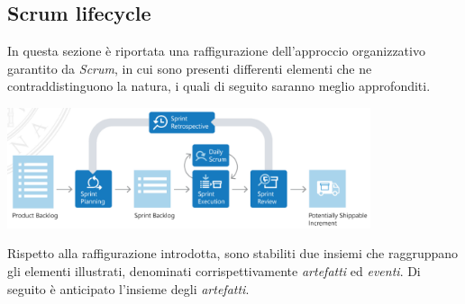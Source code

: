 \documentclass{article}
\begin{document}
\subsection*{Scrum lifecycle}
\large
In questa sezione è riportata una raffigurazione dell'approccio organizzativo garantito da \textit{Scrum}, in cui sono presenti differenti elementi che ne contraddistinguono la natura, i quali di seguito saranno meglio approfonditi.
\begin{center}
    \includegraphics[width=0.8\textwidth]{foto 1.png}
\end{center}
Rispetto alla raffigurazione introdotta, sono stabiliti due insiemi che raggruppano gli elementi illustrati, denominati corrispettivamente \textit{artefatti} ed \textit{eventi}. Di seguito è anticipato l'insieme degli \textit{artefatti}.
\end{document}
